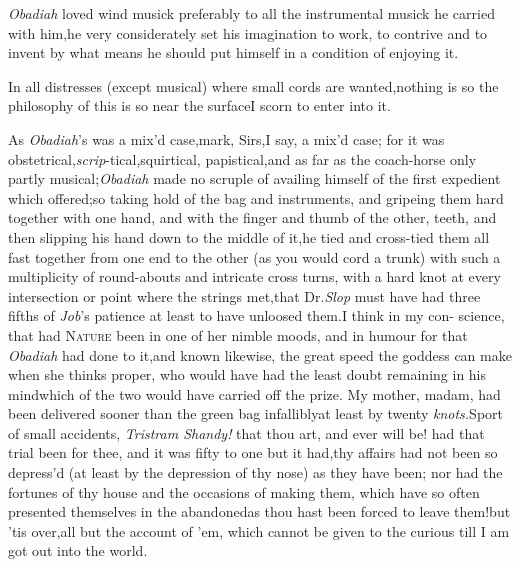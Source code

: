 \documentclass{article}
\begin{document}
 \textit{Obadiah} loved wind musick pre\-ferably to all the instrumental
mu\-sick he carried with him,\tsk he very considerately set his imagination to work, to
contrive and to invent by what means he should put himself in a condition of
enjoying it.

In all distresses (except musical) where small cords are wanted,\tsk nothing is so
\tsh the philosophy of this is so near the
surface\tsk I scorn to enter into it.

As \textit{Obadiah}’s was a mix’d case,\tsh mark,
Sirs,\tsh I say, a mix’d case; for it was
obstetrical,\tsk \textit{scrip}-tical,\tsk squirtical,
papistical,\tsk and as far as the coach-horse
 only partly
musical;\tsk \textit{Obadiah} made no scruple of availing himself
of the first expedient which offered;\tsk so taking hold of the bag and
instruments, and gripeing them hard together with one hand, and with the finger and thumb
of the other,  teeth, and
then slipping his hand down to the middle of it,\tsk he tied and
cross-tied them all fast together from one end to the other (as you
would cord a trunk) with such a multiplicity of round-abouts and
intricate cross turns, with a hard knot at every intersection or
point where the strings met,\tsk that Dr.\@ \textit{Slop} must have
had three fifths of \textit{Job}’s patience at least to have
unloosed them.\tsk I think in my
con-\break
science, that had \textsc{Nature} been in one of
her nimble moods, and in humour for
 that \textit{Obadiah} had done to
it,\tsk and known likewise, the great speed the goddess can
make when she thinks proper, who would have had the least doubt
remaining in his mind\tsk which of the two would have carried off
the prize. My mother, madam, had been delivered sooner than the
green bag infallibly\tsh at least by twenty \textit{knots.}\tsh Sport
of small accidents, \textit{Trist\-ram Shandy!} that thou art, and ever
will be! had that trial been for thee, and it was fifty to one but
it had,\tsh thy affairs had not been so
depress’d\tsk
(at least by the depression of thy nose) as
they have been; nor had the fortunes of thy house and the occasions
of making them, which have so often presented themselves in
the
abandoned\tsk as thou hast been forced
to leave them!\tsk but ’tis over,\tsk all
but the account of ’em, which cannot be given to the curious
till I am got out into the world.
\end{document}
